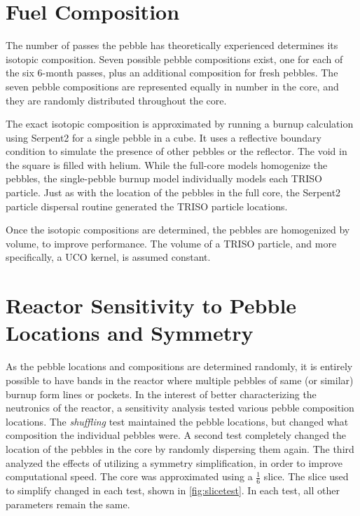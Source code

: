 \section{Fuel Composition}

The number of passes the pebble has theoretically experienced determines its isotopic composition.  Seven possible pebble compositions exist, one for each of the six 6-month passes, plus an additional composition for fresh pebbles.  The seven pebble compositions are represented equally in number in the core, and they are randomly distributed throughout the core.

The exact isotopic composition is approximated by running a burnup calculation using Serpent2 for a single pebble in a cube.  It uses a reflective boundary condition to simulate the presence of other pebbles or the reflector.  The void in the square is filled with helium.  While the full-core models homogenize the pebbles, the single-pebble burnup model individually models each TRISO particle.  Just as with the location of the pebbles in the full core, the Serpent2 particle dispersal routine generated the TRISO particle locations.



Once the isotopic compositions are determined, the pebbles are homogenized by volume, to improve performance.  The volume of a TRISO particle, and more specifically, a UCO kernel, is assumed constant.

\section{Reactor Sensitivity to Pebble Locations and Symmetry}

As the pebble locations and compositions are determined randomly, it is entirely possible to have bands in the reactor where multiple pebbles of same (or similar) burnup form lines or pockets.  In the interest of better characterizing the neutronics of the reactor, a sensitivity analysis tested various pebble composition locations.  The \emph{shuffling} test maintained the pebble locations, but changed what composition the individual pebbles were.  A second test completely changed the location of the pebbles in the core by randomly dispersing them again.  The third analyzed the effects of utilizing a symmetry simplification, in order to improve computational speed.  The core was approximated using a $\frac{1}{6}$ slice.  The slice used to simplify changed in each test, shown in \ref{fig:slicetest}.  In each test, all other parameters remain the same.


